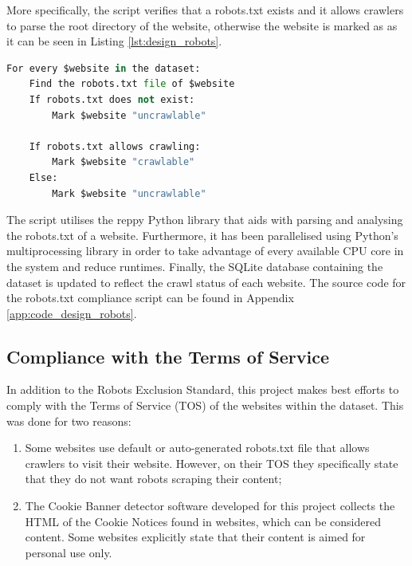 \documentclass[../main.tex]{subfiles}
\begin{document}
More specifically, the script verifies that a robots.txt exists and it allows crawlers to parse the root directory of the website, otherwise the website is marked as  as it can be seen in Listing \ref{lst:design_robots}.

\begin{lstlisting}[language=Python, caption=Pseudocode of the algorithm followed by the robots.txt parser script., label=lst:design_robots,captionpos=b, style=lst_style]
For every $website in the dataset:
    Find the robots.txt file of $website
    If robots.txt does not exist:
        Mark $website "uncrawlable"
    
    If robots.txt allows crawling:
        Mark $website "crawlable"
    Else:
        Mark $website "uncrawlable"
\end{lstlisting}

The script utilises the reppy Python library \cite{reppy} that aids with parsing and analysing the robots.txt of a website. Furthermore, it has been parallelised using Python’s multiprocessing library in order to take advantage of every available CPU core in the system and reduce runtimes. Finally, the SQLite database containing the dataset is updated to reflect the crawl status of each website. The source code for the robots.txt compliance script can be found in Appendix \ref{app:code_design_robots}.

\subsection{Compliance with the Terms of Service}
In addition to the Robots Exclusion Standard, this project makes best efforts to comply with the Terms of Service (TOS) of the websites within the dataset. This was done for two reasons:

\begin{enumerate}
    \item Some websites use default or auto-generated robots.txt file that allows crawlers to visit their website. However, on their TOS they specifically state that they do not want robots scraping their content;
    
    \item The Cookie Banner detector software developed for this project collects the HTML of the Cookie Notices found in websites, which can be considered content. Some websites explicitly state that their content is aimed for personal use only. 
\end{enumerate}
\end{document}
